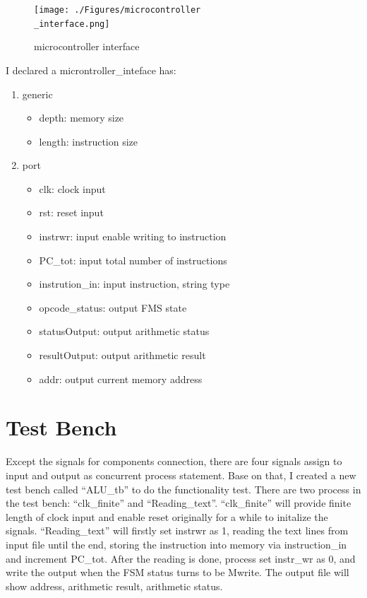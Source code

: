 \begin{figure}[!h]
    \centerline{\texttt{[image: ./Figures/microcontroller\\\_interface.png]}}
    \caption{microcontroller interface\label{fig00} }
\end{figure}

I declared a microntroller\_inteface has:
\begin{enumerate}
  \item generic
  \begin{itemize}
  \item depth: memory size
  \item length: instruction size
  \end{itemize}
  \item port
  \begin{itemize}
  \item clk: clock input
  \item rst: reset input
  \item instrwr: input enable writing to instruction
  \item PC\_tot: input total number of instructions
  \item instrution\_in: input instruction, string type
  \item opcode\_status: output FMS state
  \item statusOutput: output arithmetic status
  \item resultOutput: output arithmetic result
  \item addr: output current memory address 
  \end{itemize}
\end{enumerate}



\section{Test Bench}
Except the signals for components connection, there are four signals assign to input and output as concurrent process statement.
Base on that, I created a new test bench called ``ALU\_tb'' to do the functionality test.
There are two process in the test bench: ``clk\_finite'' and ``Reading\_text''.  ``clk\_finite''  will provide
finite length of clock input and enable reset originally for a while to initalize the signals. ``Reading\_text'' will 
firstly set instrwr as 1, reading the text lines from input file until the end, storing the instruction into memory via instruction\_in and increment PC\_tot.
After the reading is done, process set instr\_wr as 0, and write the output when the FSM status turns to be Mwrite. The output file will show
address, arithmetic result, arithmetic status.

